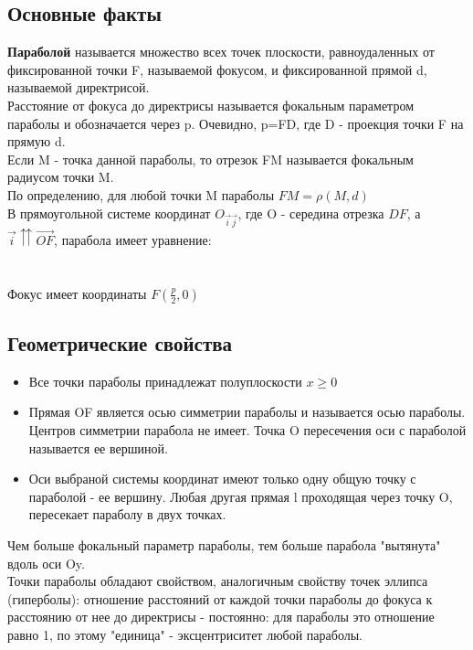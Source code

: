 \documentclass{book}
\begin{document}
\subsection{Основные факты}
\textbf{Параболой} называется множество всех точек плоскости, равноудаленных от фиксированной точки F, называемой фокусом, и фиксированной прямой d, называемой директрисой.\\
Расстояние от фокуса до директрисы называется фокальным параметром параболы и обозначается через p. Очевидно, p=FD, где D - проекция точки F на прямую d.\\
Если M - точка данной параболы, то отрезок FM называется фокальным радиусом точки M.\\
По определению, для любой точки M параболы $FM = \rho(M,d)$\\
В прямоугольной системе координат $O_{\overrightarrow{i}\overrightarrow{j}}$,  где O - середина отрезка $DF$, а $\overrightarrow{i}\upuparrows\overrightarrow{OF}$, парабола имеет уравнение:\\
\\
\\
Фокус имеет координаты $F(\frac{p}{2},0)$\\
\subsection{Геометрические свойства}
\begin{itemize}
    \item Все точки параболы принадлежат полуплоскости $x\geqslant0$
    \item Прямая OF является осью симметрии параболы и называется осью параболы. Центров симметрии парабола не имеет. Точка O пересечения оси с параболой называется ее вершиной.
    \item Оси выбраной системы координат имеют только одну общую точку с параболой - ее вершину. Любая другая прямая l проходящая через точку O, пересекает параболу в двух точках.
\end{itemize}   
Чем больше фокальный параметр параболы, тем больше парабола "вытянута" вдоль оси Oy.\\
Точки параболы обладают свойством, аналогичным свойству точек эллипса (гиперболы): отношение расстояний от каждой точки параболы до фокуса к расстоянию от нее до директрисы - постоянно: для параболы это отношение равно 1, по этому "единица" - эксцентриситет любой параболы.
\end{document}

